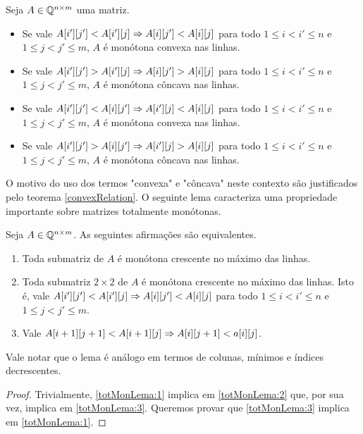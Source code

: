 \begin{defi}
Seja $A \in \mathbb{Q}^{n \times m}$ uma matriz.
    \begin{itemize}
        \item Se vale $A[i'][j'] < A[i'][j] \Rightarrow A[i][j'] < A[i][j]$ para todo $1 \leq i < i' \leq n$ e $1 \leq j < j' \leq m$, $A$ é monótona convexa nas linhas.
        \item Se vale $A[i'][j'] > A[i'][j] \Rightarrow A[i][j'] > A[i][j]$ para todo $1 \leq i < i' \leq n$ e $1 \leq j < j' \leq m$, $A$ é monótona côncava nas linhas.
        \item Se vale $A[i'][j'] < A[i][j'] \Rightarrow A[i'][j] < A[i][j]$ para todo $1 \leq i < i' \leq n$ e $1 \leq j < j' \leq m$, $A$ é monótona convexa nas linhas.
        \item Se vale $A[i'][j'] > A[i][j'] \Rightarrow A[i'][j] > A[i][j]$ para todo $1 \leq i < i' \leq n$ e $1 \leq j < j' \leq m$, $A$ é monótona côncava nas linhas.
    \end{itemize}
\end{defi}

O motivo do uso dos termos "convexa" e "côncava" neste contexto são justificados pelo teorema \ref{convexRelation}. O seguinte lema caracteriza uma propriedade importante sobre matrizes totalmente monótonas.  

\begin{lema}
Seja $A \in \mathbb{Q}^{n \times m}$. As seguintes afirmações são equivalentes.
    \begin{enumerate}
        \item Toda submatriz de $A$ é monótona crescente no máximo das linhas. \label{totMonLema:1}
        \item Toda submatriz $2 \times 2$ de $A$ é monótona crescente no máximo das linhas. Isto é, vale $A[i'][j'] < A[i'][j] \Rightarrow A[i][j'] < A[i][j]$ para todo $1 \leq i < i' \leq n$ e $1 \leq j < j' \leq m$. \label{totMonLema:2}
        \item Vale $A[i+1][j+1] < A[i+1][j] \Rightarrow A[i][j+1] < a[i][j]$. \label{totMonLema:3}
    \end{enumerate}
Vale notar que o lema é análogo em termos de colunas, mínimos e índices decrescentes.
\end{lema}

\begin{proof}
Trivialmente, \ref{totMonLema:1} implica em \ref{totMonLema:2} que, por sua vez, implica em \ref{totMonLema:3}. Queremos provar que \ref{totMonLema:3} implica em \ref{totMonLema:1}.
\end{proof}
